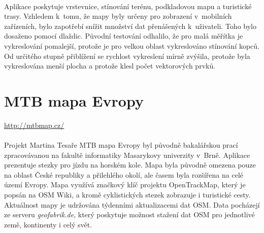 \documentclass[11pt,a4paper,titlepage,oneside]{book}
\begin{document}
		\paragraph{}  Aplikace poskytuje vrstevnice, stínování terénu, podkladovou mapu a turistické trasy. Vzhledem k~tomu, že mapy byly určeny pro zobrazení v~mobilních zařízeních, bylo zapotřebí snížit množství dat přenášených k~uživateli. Toho bylo dosaženo pomocí dlaždic. Původní testování odhalilo, že pro malá měřítka je vykreslování pomalejší, protože je pro velkou oblast vykreslováno stínování kopců\cite{OTM}. Od určitého stupně přiblížení se rychlost vykreslení mírně zvýšila, protože byla vykreslována menší plocha a protože klesl počet vektorových prvků.

	\section{MTB mapa Evropy}
		\label{sec:MTB}
		\url{http://mtbmap.cz/}
		\paragraph{} Projekt Martina Tesaře MTB mapa Evropy byl původně bakalářskou prací zpracovávanou na fakultě informatiky Masarykovy univerzity v~Brně. Aplikace prezentuje stezky pro jízdu na horském kole. Mapa byla původně omezena pouze na oblast České republiky a přilehlého okolí, ale časem byla rozšířena na celé území Evropy. Mapa využívá značkový klíč projektu OpenTrackMap, který je popsán na \ac{OSM} Wiki\cite{otm_klic}, a kromě cyklistických stezek zobrazuje i turistické cesty. Aktuálnost mapy je udržována týdenními aktualizacemi dat \ac{OSM}. Data pocházejí ze serveru \textit{geofabrik.de}, který poskytuje možnost stažení dat \ac{OSM} pro jednotlivé země, kontinenty i celý svět.



\end{document}
